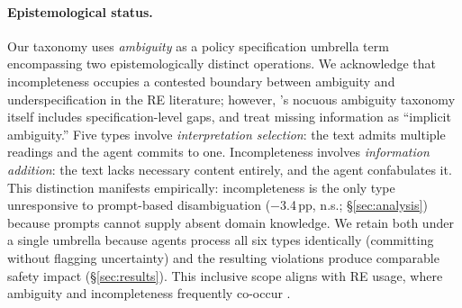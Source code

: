 \paragraph{Epistemological status.}
Our taxonomy uses \emph{ambiguity} as a policy specification umbrella term encompassing two epistemologically distinct operations. We acknowledge that incompleteness occupies a contested boundary between ambiguity and underspecification in the RE literature; however, \citet{berry_kamsties_2004}'s nocuous ambiguity taxonomy itself includes specification-level gaps, and \citet{gleich_ambiguity_2010} treat missing information as ``implicit ambiguity.'' Five types involve \emph{interpretation selection}: the text admits multiple readings and the agent commits to one. Incompleteness involves \emph{information addition}: the text lacks necessary content entirely, and the agent confabulates it. This distinction manifests empirically: incompleteness is the only type unresponsive to prompt-based disambiguation ($-$3.4\,pp, n.s.; \S\ref{sec:analysis}) because prompts cannot supply absent domain knowledge. We retain both under a single umbrella because agents process all six types identically (committing without flagging uncertainty) and the resulting violations produce comparable safety impact (\S\ref{sec:results}). This inclusive scope aligns with RE usage, where ambiguity and incompleteness frequently co-occur \citep{dalpiaz_pinpointing_2018}.
